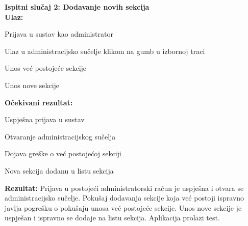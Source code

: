 			 \noindent \textbf{Ispitni slučaj 2: Dodavanje novih sekcija}\\
			 \textbf{Ulaz:}
			 \begin{packed_enum}
			 	\item {Prijava u sustav kao administrator}
			 	\item {Ulaz u administracijsko sučelje klikom na gumb u izbornoj traci}
			 	\item {Unos već postojeće sekcije}
			 	\item {Unos nove sekcije}
			 \end{packed_enum}
			 \textbf{Očekivani rezultat:}
			 \begin{packed_enum}
			 	\item {Uspješna prijava u sustav}
			 	\item {Otvaranje administracijskog sučelja}
			 	\item {Dojava greške o već postojećoj sekciji}
			 	\item {Nova sekcija dodanu u listu sekcija}
			 \end{packed_enum}
			 \textbf{Rezultat: }Prijava u postojeći administratorski račun je uspješna i otvara se administracijsko sučelje. Pokušaj dodavanja sekcije koja već postoji ispravno javlja pogrešku o pokušaju unosa već postojeće sekcije. Unos nove sekcije je uspješan i ispravno se dodaje na listu sekcija. {\color{green} Aplikacija prolazi test.}\\
			 
